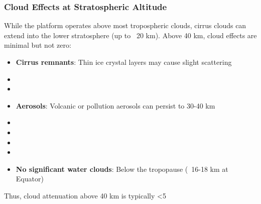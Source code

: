 {{{{\subsubsection{Cloud Effects at Stratospheric Altitude}
While the platform operates above most tropospheric clouds, cirrus clouds can extend into the lower stratosphere (up to ~20 km). Above 40 km, cloud effects are minimal but not zero:
\begin{itemize}
    \item \textbf{Cirrus remnants}: Thin ice crystal layers may cause slight scattering
    \item \item \item \textbf{Aerosols}: Volcanic or pollution aerosols can persist to 30-40 km
    \item \item \item \item \item \textbf{No significant water clouds}: Below the tropopause (~16-18 km at Equator)
\end{itemize}
Thus, cloud attenuation above 40 km is typically <5%

}}}}
